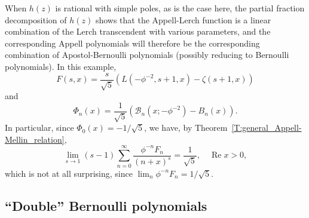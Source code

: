 \documentclass[11pt,a4paper]{amsart}
\newcommand{\AB}{\mathcal{B}}
\renewcommand{\Re}{\operatorname{Re}}
\theoremstyle{plain}
\theoremstyle{plain}
\theoremstyle{definition}
\theoremstyle{remark}
\begin{document}
When $h(z)$ is rational with simple poles, as is the case here, the partial fraction decomposition of $h(z)$ shows that the Appell-Lerch function is a linear combination of the Lerch transcendent with various parameters, and the corresponding Appell polynomials will therefore be the corresponding combination of Apostol-Bernoulli polynomials (possibly reducing to Bernoulli polynomials). In this example,
\[
	F(s,x) = \frac{s}{\sqrt{5}} \left( L(-\phi^{-2},s+1,x) - \zeta (s+1,x) \right)
\]
and
\[
	\Phi_{n}(x) = \frac{1}{\sqrt{5}} \left( \AB_{n}(x; -\phi^{-2}) - B_{n}(x) \right).
\]
In particular, since $\Phi_{0}(x) = -1/\sqrt{5}$, we have, by Theorem~\ref{T:general_Appell-Mellin_relation},
\[
	\lim_{s \to 1} (s-1) \sum_{n=0}^{\infty} \frac{\phi^{-n} F_{n}}{(n+x)^{s}} = \frac{1}{\sqrt{5}},
	\quad
	\Re x > 0,
\]
which is not at all surprising, since $\lim_{n} \phi^{-n} F_{n} = 1/\sqrt{5}$.



\subsection{``Double'' Bernoulli polynomials}
\label{subsec:double_Bernoulli}
\end{document}
